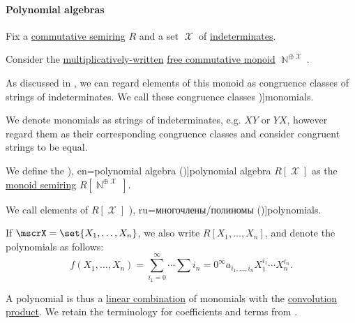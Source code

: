 \paragraph{Polynomial algebras}

\begin{definition}\label{def:polynomial_algebra}\mimprovised
  Fix a \hyperref[def:semiring/commutative]{commutative semiring} \( R \) and a set \( \mscrX \) of \hyperref[con:indeterminate]{indeterminates}.

  \begin{thmenum}
     Consider the \hyperref[def:free_commutative_monoid]{multiplicatively-written} \hyperref[def:free_commutative_monoid]{free commutative monoid} \( \BbbN^{\oplus \mscrX} \).

    As discussed in , we can regard elements of this monoid as congruence classes of strings of indeterminates. We call these congruence classes \term[ru=одночлен/моном (\cite[\S 11.3]{Тыртышников2007ЛинейнаяАлгебра})]{monomials}.

    We denote monomials as strings of indeterminates, e.g. \( XY \) or \( YX \), however regard them as their corresponding congruence classes and consider congruent strings to be equal.

     We define the \term[ru=алгебра многочленов (\cite[92]{Винберг2014КурсАлгебры}), en=polynomial algebra (\cite[473]{Bourbaki1998Algebra1to3})]{polynomial algebra} \( R[\mscrX] \) as the \hyperref[def:semigroup_algebra]{monoid semiring} \( R[\BbbN^{\oplus \mscrX}] \).

    We call elements of \( R[\mscrX] \) \term[bg=полиноми (\cite[1]{Обрешков1962ВисшаАлгебра}), ru=многочлены/полиномы (\cite[\S 11.3]{Тыртышников2007ЛинейнаяАлгебра})]{polynomials}.

    If \( \mscrX = \set{ X_1, \ldots, X_n } \), we also write \( R[X_1, \ldots, X_n] \), and denote the polynomials as follows:
    \begin{equation}\label{eq:def:polynomial_algebra/polynomials}
      f(X_1, \ldots, X_n) = \sum_{i_1=0}^\infty \cdots \sum{i_n=0}^\infty a_{i_1,\ldots,i_n} X_1^{i_1} \cdots X_n^{i_n}.
    \end{equation}

    A polynomial is thus a \hyperref[def:linear_combination]{linear combination} of monomials with the \hyperref[def:semigroup_algebra]{convolution product}. We retain the terminology for coefficients and terms from .


\end{thmenum}
\end{definition}

